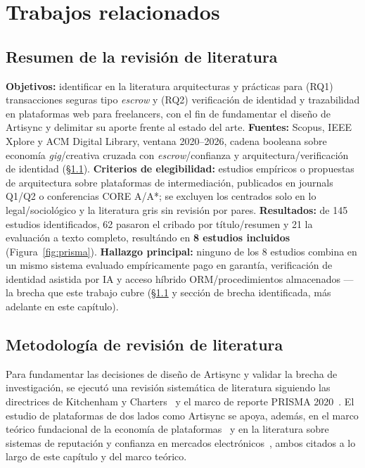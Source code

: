 
\chapter{Trabajos relacionados}
\label{cap:trabajos-relacionados}

\section*{Resumen de la revisi\'on de literatura}

\textbf{Objetivos:} identificar en la literatura arquitecturas y
pr\'acticas para (RQ1) transacciones seguras tipo \emph{escrow} y (RQ2)
verificaci\'on de identidad y trazabilidad en plataformas web para
freelancers, con el fin de fundamentar el dise\~no de Artisync y
delimitar su aporte frente al estado del arte.
\textbf{Fuentes:} Scopus, IEEE Xplore y ACM Digital Library, ventana
2020--2026, cadena booleana sobre econom\'ia \emph{gig}/creativa cruzada
con \emph{escrow}/confianza y arquitectura/verificaci\'on de identidad
(\S\ref{sec:metodologia-revision}).
\textbf{Criterios de elegibilidad:} estudios emp\'iricos o propuestas de
arquitectura sobre plataformas de intermediaci\'on, publicados en
journals Q1/Q2 o conferencias CORE A/A*; se excluyen los centrados solo
en lo legal/sociol\'ogico y la literatura gris sin revisi\'on por pares.
\textbf{Resultados:} de 145 estudios identificados, 62 pasaron el
cribado por t\'itulo/resumen y 21 la evaluaci\'on a texto completo,
result\'ando en \textbf{8 estudios incluidos} (Figura~\ref{fig:prisma}).
\textbf{Hallazgo principal:} ninguno de los 8 estudios combina en un
mismo sistema evaluado emp\'iricamente pago en garant\'ia, verificaci\'on
de identidad asistida por IA y acceso h\'ibrido ORM/procedimientos
almacenados --- la brecha que este trabajo cubre
(\S\ref{sec:metodologia-revision} y secci\'on de brecha identificada,
m\'as adelante en este cap\'itulo).

\section{Metodolog\'ia de revisi\'on de literatura}
\label{sec:metodologia-revision}

Para fundamentar las decisiones de dise\~no de Artisync y validar la brecha
de investigaci\'on, se ejecut\'o una revisi\'on sistem\'atica de literatura
siguiendo las directrices de Kitchenham y Charters~\cite{KITCHENHAM2007} y
el marco de reporte PRISMA 2020~\cite{PRISMA2021}. El estudio de plataformas
de dos lados como Artisync se apoya, adem\'as, en el marco te\'orico fundacional
de la econom\'ia de plataformas~\cite{ROCHET2003} y en la literatura sobre
sistemas de reputaci\'on y confianza en mercados electr\'onicos~\cite{RESNICK2000},
ambos citados a lo largo de este cap\'itulo y del marco te\'orico.

